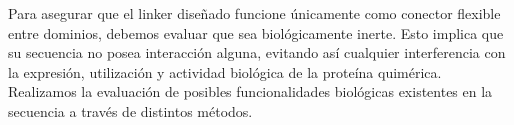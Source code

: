 
Para asegurar que el linker diseñado funcione únicamente como conector flexible entre dominios, debemos evaluar que sea biológicamente inerte.
Esto implica que su secuencia no posea interacción alguna, evitando así cualquier interferencia con la expresión, utilización y actividad biológica de la proteína quimérica.
Realizamos la evaluación de posibles funcionalidades biológicas existentes en la secuencia a través de distintos métodos.








